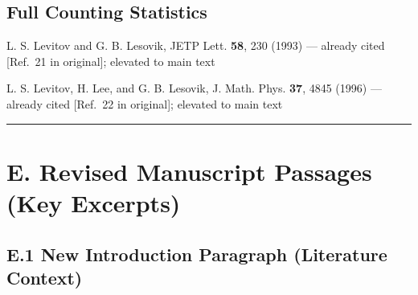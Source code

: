 \documentclass[11pt,a4paper]{article}
\begin{document}
\subsection*{Full Counting Statistics}
\begin{enumerate}[leftmargin=*,resume,label={[D\arabic*]}]
\item L. S. Levitov and G. B. Lesovik, JETP Lett. \textbf{58}, 230 (1993) --- already cited [Ref.~21 in original]; elevated to main text
\item L. S. Levitov, H. Lee, and G. B. Lesovik, J. Math. Phys. \textbf{37}, 4845 (1996) --- already cited [Ref.~22 in original]; elevated to main text
\end{enumerate}

\vspace{1em}
\hrule
\vspace{1em}

\section*{E. Revised Manuscript Passages (Key Excerpts)}

\subsection*{E.1 New Introduction Paragraph (Literature Context)}
\end{document}
